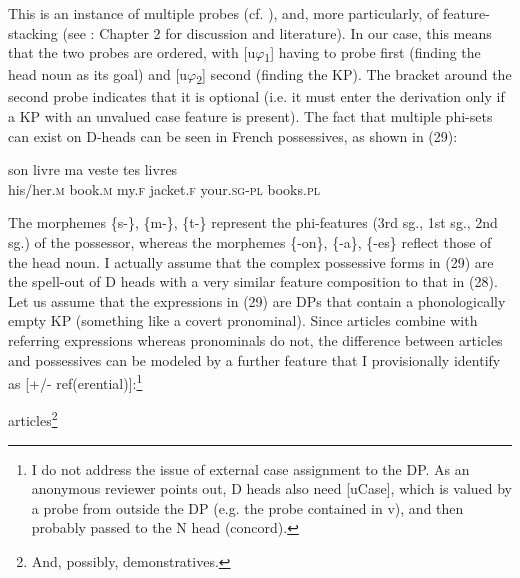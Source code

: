 \documentclass[output=paper]{langsci/langscibook}
\begin{document}
This is an instance of multiple probes (cf. \citealt{Chomsky2008}), and, more particularly, of feature-stacking (see \citealt{Manetta2011}: Chapter 2 for discussion and literature). In our case, this means that the two probes are ordered, with [u$\varphi $\textsubscript{1}] having to probe first (finding the head noun as its goal) and [u$\varphi $\textsubscript{2}] second (finding the KP). The bracket around the second probe indicates that it is optional (i.e. it must enter the derivation only if a KP with an unvalued case feature is present). The fact that multiple phi-sets can exist on D-heads can be seen in French possessives, as shown in (29):

\ea%
    \label{ex:mensch:29}
    \gll   son    livre    ma  veste    tes    livres\\
           his/her.\textsc{m}  book.\textsc{m}  my.\textsc{f}  jacket.\textsc{f}  your.\textsc{sg-pl}  books.\textsc{pl}\\
\z

The morphemes \{s-\}, \{m-\}, \{t-\} represent the phi-features (3rd sg., 1st sg., 2nd sg.) of the possessor, whereas the morphemes \{-on\}, \{-a\}, \{-es\} reflect those of the head noun. I actually assume that the complex possessive forms in (29) are the spell-out of D heads with a very similar feature composition to that in (28). Let us assume that the expressions in (29) are DPs that contain a phonologically empty KP (something like a covert pronominal). Since articles combine with referring expressions whereas pronominals do not, the difference between articles and possessives can be modeled by a further feature that I provisionally identify as [+/- ref(erential)]:\footnote{I do not address the issue of external case assignment to the DP. As an anonymous reviewer points out, D heads also need [uCase], which is valued by a probe from outside the DP (e.g. the probe contained in v), and then probably passed to the N head (concord).}

\ea%
    \label{ex:mensch:30}
    \ea articles\footnote{And, possibly, demonstratives.}\\\relax
        
\end{document}
